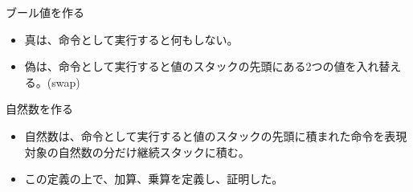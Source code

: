 \documentclass[cjk, 14pt, dvipdfm]{beamer}
\begin{document}
\begin{frame}{ブール値を作る}

  \begin{itemize}
    \item 真は、命令として実行すると何もしない。
    \item 偽は、命令として実行すると値のスタックの先頭にある2つの値を入れ替える。(swap)
  \end{itemize}

\end{frame}

\begin{frame}{自然数を作る}

  \begin{itemize}
    \item 自然数は、命令として実行すると値のスタックの先頭に積まれた命令を表現対象の自然数の分だけ継続スタックに積む。
    \item この定義の上で、加算、乗算を定義し、証明した。
  \end{itemize}

\end{frame}
\end{document}
